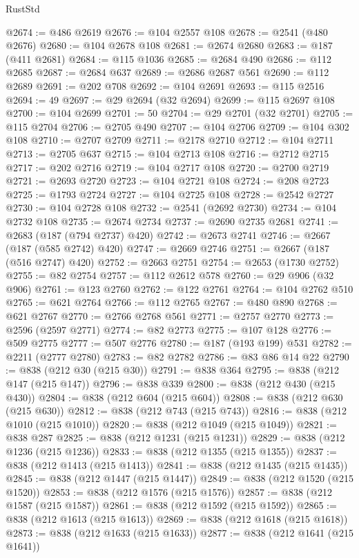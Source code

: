 \begin{lexlean}{RustStd}
\begin{coremodule}
@2674 := @486 @2619
@2676 := @104 @2557 @108
@2678 := @2541 (@480 @2676)
@2680 := @104 @2678 @108
@2681 := @2674 @2680
@2683 := @187 (@411 @2681)
@2684 := @115 @1036
@2685 := @2684 @490
@2686 := @112 @2685
@2687 := @2684 @637
@2689 := @2686 @2687 @561
@2690 := @112 @2689
@2691 := @202 @708
@2692 := @104 @2691
@2693 := @115 @2516
@2694 := 49
@2697 := @29 @2694 (@32 @2694)
@2699 := @115 @2697 @108
@2700 := @104 @2699
@2701 := 50
@2704 := @29 @2701 (@32 @2701)
@2705 := @115 @2704
@2706 := @2705 @490
@2707 := @104 @2706
@2709 := @104 @302 @108
@2710 := @2707 @2709
@2711 := @2178 @2710
@2712 := @104 @2711
@2713 := @2705 @637
@2715 := @104 @2713 @108
@2716 := @2712 @2715
@2717 := @202 @2716
@2719 := @104 @2717 @108
@2720 := @2700 @2719
@2721 := @2693 @2720
@2723 := @104 @2721 @108
@2724 := @208 @2723
@2725 := @1793 @2724
@2727 := @104 @2725 @108
@2728 := @2542 @2727
@2730 := @104 @2728 @108
@2732 := @2541 (@2692 @2730)
@2734 := @104 @2732 @108
@2735 := @2674 @2734
@2737 := @2690 @2735 @2681
@2741 := @2683 (@187 (@794 @2737) @420)
@2742 := @2673 @2741
@2746 := @2667 (@187 (@585 @2742) @420)
@2747 := @2669 @2746
@2751 := @2667 (@187 (@516 @2747) @420)
@2752 := @2663 @2751
@2754 := @2653 (@1730 @2752)
@2755 := @82 @2754
@2757 := @112 @2612 @578
@2760 := @29 @906 (@32 @906)
@2761 := @123 @2760
@2762 := @122 @2761
@2764 := @104 @2762 @510
@2765 := @621 @2764
@2766 := @112 @2765
@2767 := @480 @890
@2768 := @621 @2767
@2770 := @2766 @2768 @561
@2771 := @2757 @2770
@2773 := @2596 (@2597 @2771)
@2774 := @82 @2773
@2775 := @107 @128
@2776 := @509 @2775
@2777 := @507 @2776
@2780 := @187 (@193 @199) @531
@2782 := @2211 (@2777 @2780)
@2783 := @82 @2782
@2786 := @83 @86 @14 @22
@2790 := @838 (@212 @30 (@215 @30))
@2791 := @838 @364
@2795 := @838 (@212 @147 (@215 @147))
@2796 := @838 @339
@2800 := @838 (@212 @430 (@215 @430))
@2804 := @838 (@212 @604 (@215 @604))
@2808 := @838 (@212 @630 (@215 @630))
@2812 := @838 (@212 @743 (@215 @743))
@2816 := @838 (@212 @1010 (@215 @1010))
@2820 := @838 (@212 @1049 (@215 @1049))
@2821 := @838 @287
@2825 := @838 (@212 @1231 (@215 @1231))
@2829 := @838 (@212 @1236 (@215 @1236))
@2833 := @838 (@212 @1355 (@215 @1355))
@2837 := @838 (@212 @1413 (@215 @1413))
@2841 := @838 (@212 @1435 (@215 @1435))
@2845 := @838 (@212 @1447 (@215 @1447))
@2849 := @838 (@212 @1520 (@215 @1520))
@2853 := @838 (@212 @1576 (@215 @1576))
@2857 := @838 (@212 @1587 (@215 @1587))
@2861 := @838 (@212 @1592 (@215 @1592))
@2865 := @838 (@212 @1613 (@215 @1613))
@2869 := @838 (@212 @1618 (@215 @1618))
@2873 := @838 (@212 @1633 (@215 @1633))
@2877 := @838 (@212 @1641 (@215 @1641))

\end{coremodule}
\end{lexlean}
